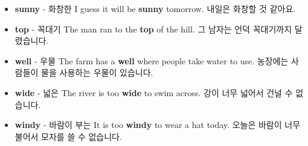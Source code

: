 \documentclass{article}
\begin{document}
\begin{addmargin}[1em]{1em}
\begin{itemize}
        \item \fontsize{12pt}{14pt}\selectfont \textbf{sunny} - 화창한 \newline
        I guess it will be \textbf{sunny} tomorrow. \newline
        내일은 화창할 것 같아요.
        
        \item \fontsize{12pt}{14pt}\selectfont \textbf{top} - 꼭대기 \newline
        The man ran to the \textbf{top} of the hill. \newline
        그 남자는 언덕 꼭대기까지 달렸습니다.
        
        \item \fontsize{12pt}{14pt}\selectfont \textbf{well} - 우물 \newline
        The farm has a \textbf{well} where people take water to use. \newline
        농장에는 사람들이 물을 사용하는 우물이 있습니다.
        
        \item \fontsize{12pt}{14pt}\selectfont \textbf{wide} - 넓은 \newline
        The river is too \textbf{wide} to swim across. \newline
        강이 너무 넓어서 건널 수 없습니다.
        
        \item \fontsize{12pt}{14pt}\selectfont \textbf{windy} - 바람이 부는 \newline
        It is too \textbf{windy} to wear a hat today. \newline
        오늘은 바람이 너무 불어서 모자를 쓸 수 없습니다.
    \end{itemize}
\end{addmargin}

\newpage

\end{document}
